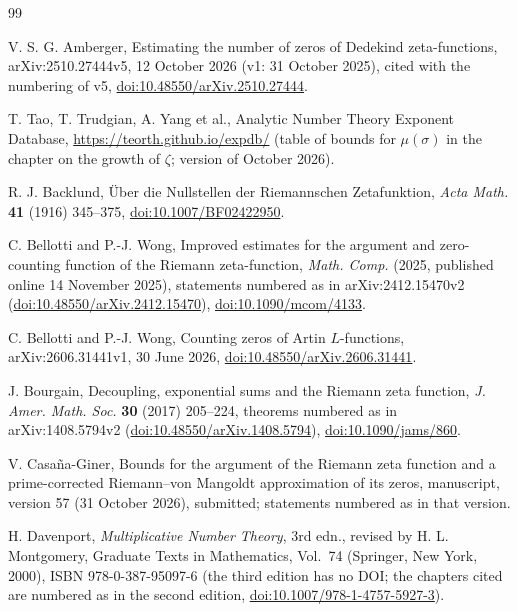 \documentclass[11pt,reqno]{amsart}
\numberwithin{equation}{section}
\theoremstyle{definition}
\theoremstyle{remark}
\begin{document}
\begin{thebibliography}{99}

 V. S. G. Amberger, Estimating the number of zeros of Dedekind zeta-functions, arXiv:2510.27444v5, 12 October 2026 (v1: 31 October 2025), cited with the numbering of v5, \href{https://doi.org/10.48550/arXiv.2510.27444}{doi:10.48550/arXiv.2510.27444}.

 T. Tao, T. Trudgian, A. Yang et al., Analytic Number Theory Exponent Database, \url{https://teorth.github.io/expdb/} (table of bounds for $\mu(\sigma)$ in the chapter on the growth of $\zeta$; version of October 2026).

 R. J. Backlund, \"Uber die Nullstellen der Riemannschen Zetafunktion, \textit{Acta Math.} \textbf{41} (1916) 345--375, \href{https://doi.org/10.1007/BF02422950}{doi:10.1007/BF02422950}.

 C. Bellotti and P.-J. Wong, Improved estimates for the argument and zero-counting function of the Riemann zeta-function, \textit{Math. Comp.} (2025, published online 14 November 2025), statements numbered as in arXiv:2412.15470v2 (\href{https://doi.org/10.48550/arXiv.2412.15470}{doi:10.48550/arXiv.2412.15470}), \href{https://doi.org/10.1090/mcom/4133}{doi:10.1090/mcom/4133}.

 C. Bellotti and P.-J. Wong, Counting zeros of Artin $L$-functions, arXiv:2606.31441v1, 30 June 2026, \href{https://doi.org/10.48550/arXiv.2606.31441}{doi:10.48550/arXiv.2606.31441}.

 J. Bourgain, Decoupling, exponential sums and the Riemann zeta function, \textit{J. Amer. Math. Soc.} \textbf{30} (2017) 205--224, theorems numbered as in arXiv:1408.5794v2 (\href{https://doi.org/10.48550/arXiv.1408.5794}{doi:10.48550/arXiv.1408.5794}), \href{https://doi.org/10.1090/jams/860}{doi:10.1090/jams/860}.

 V. Casa\~na-Giner, Bounds for the argument of the Riemann zeta function and a prime-corrected Riemann--von Mangoldt approximation of its zeros, manuscript, version 57 (31 October 2026), submitted; statements numbered as in that version.

 H. Davenport, \textit{Multiplicative Number Theory}, 3rd edn., revised by H. L. Montgomery, Graduate Texts in Mathematics, Vol.~74 (Springer, New York, 2000), ISBN 978-0-387-95097-6 (the third edition has no DOI; the chapters cited are numbered as in the second edition, \href{https://doi.org/10.1007/978-1-4757-5927-3}{doi:10.1007/978-1-4757-5927-3}).


\end{thebibliography}
\end{document}
